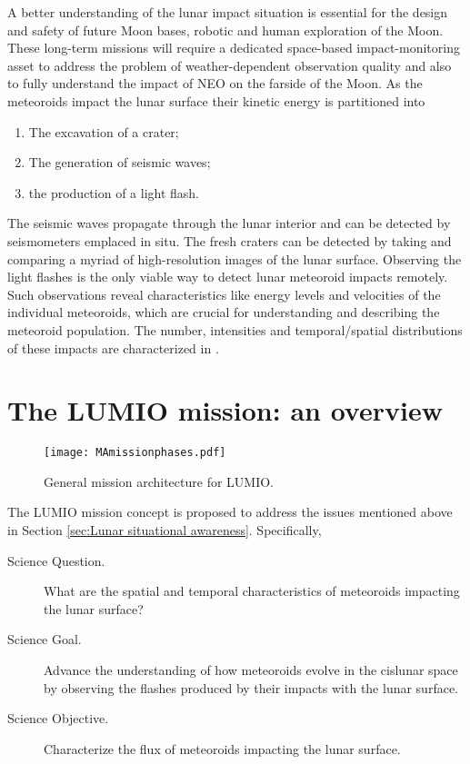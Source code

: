 A better understanding of the lunar impact situation is essential for the design and safety of future Moon bases, robotic and human exploration of the Moon. These long-term missions will require a dedicated space-based impact-monitoring asset to address the problem of weather-dependent observation quality and also to fully understand the impact of NEO on the farside of the Moon. As the meteoroids impact the lunar surface their kinetic energy is partitioned into
%
\begin{enumerate}
	\item The excavation of a crater;
	\item The generation of seismic waves;
	\item the production of a light flash.
\end{enumerate}
%
The seismic waves propagate through the lunar interior and can be detected by seismometers emplaced in situ. The fresh craters can be detected by taking and comparing a myriad of high-resolution images of the lunar surface. Observing the light flashes is the only viable way to detect lunar meteoroid impacts remotely. Such observations reveal characteristics like energy levels and velocities of the individual meteoroids, which are crucial for understanding and describing the meteoroid population. The number, intensities and temporal/spatial distributions of these impacts are characterized in \textcite{oberst2012present}.


%
\section{The LUMIO mission: an overview}\label{sec:LUMIO mission}
%
\begin{figure*}[t!]
	\centering
	\texttt{[image: MAmissionphases.pdf]}
	\caption{General mission architecture for LUMIO.}
	\label{fig:LUMIOGeneralArchitecture}
\end{figure*}
%
The {LUMIO} mission concept is proposed to address the issues mentioned above in Section \ref{sec:Lunar situational awareness}. Specifically,
%
\begin{description}
	\item[Science Question.] What are the spatial and temporal characteristics of meteoroids impacting the lunar surface?
	\item[Science Goal.] Advance the understanding of how meteoroids evolve in the cislunar space by observing the flashes produced by their impacts with the lunar surface.
	\item[Science Objective.]  Characterize the flux of meteoroids impacting the lunar surface.
\end{description}
%

